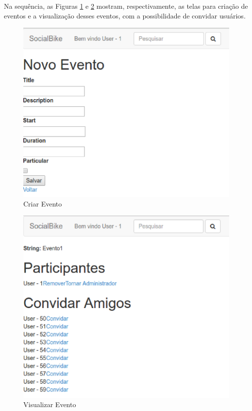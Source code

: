 Na sequência, as Figuras \ref{criar_evento} e \ref{evento} mostram, respectivamente, as telas para criação de eventos e a visualização desses eventos, com a possibilidade de convidar usuários.

\newpage
\begin{figure}[!h]
	\centering
	\includegraphics[scale=0.5]{figuras/resultados/criar_evento.eps}
	\caption[Criar Evento]{Criar Evento}
	\label{criar_evento}
\end{figure}

\begin{figure}[!h]
	\centering
	\includegraphics[scale=0.5]{figuras/resultados/evento.eps}
	\caption[Visualizar Evento]{Visualizar Evento}
	\label{evento}
\end{figure}

